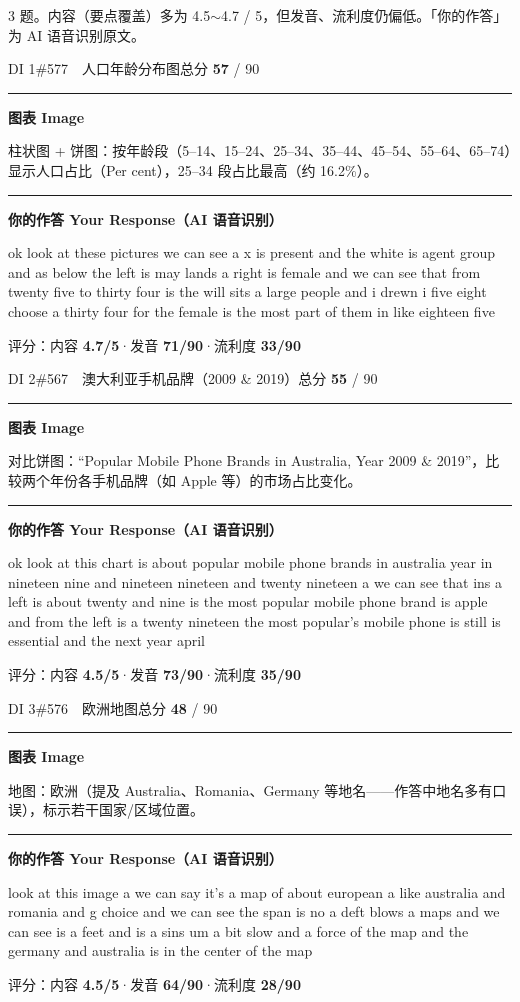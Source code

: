\documentclass[11pt]{article}
\newcommand{\sfull}[1]{\textcolor{cFix}{\bfseries #1}}     %
\newcommand{\spart}[1]{\textcolor{cPartial}{\bfseries #1}} %
\newcommand{\szero}[1]{\textcolor{cWrong}{\bfseries #1}}   %
\newcommand{\ptesub}[1]{%
  \par\needspace{2\baselineskip}\smallskip
  {\color{cAccent}\rule[-0.2ex]{3pt}{1.05em}}\hspace{6pt}%
  {\bfseries\color{cHead}#1}\par\nopagebreak\smallskip}
\begin{document}
{\small\color{gray} 3 题。内容（要点覆盖）多为 4.5$\sim$4.7 / 5，但发音、流利度仍偏低。「你的作答」为 AI 语音识别原文。}\smallskip

\begin{qblock}{DI 1\quad \#577\ \ 人口年龄分布图}{总分 \textcolor{cAccent}{\bfseries 57} / 90}
\ptesub{图表 Image}
\begin{promptbox}
柱状图 + 饼图：按年龄段（5--14、15--24、25--34、35--44、45--54、55--64、65--74）显示人口占比（Per cent），25--34 段占比最高（约 16.2\%）。
\end{promptbox}
\ptesub{你的作答 Your Response（AI 语音识别）}
\begin{youbox}
ok look at these pictures we can see a x is present and the white is agent group and as below the left is may lands a right is female and we can see that from twenty five to thirty four is the will sits a large people and i drewn i five eight choose a thirty four for the female is the most part of them in like eighteen five
\end{youbox}
{\small 评分：内容 \sfull{4.7/5}\quad·\quad 发音 \spart{71/90}\quad·\quad 流利度 \szero{33/90}}
\end{qblock}

\begin{qblock}{DI 2\quad \#567\ \ 澳大利亚手机品牌（2009 \& 2019）}{总分 \textcolor{cAccent}{\bfseries 55} / 90}
\ptesub{图表 Image}
\begin{promptbox}
对比饼图：``Popular Mobile Phone Brands in Australia, Year 2009 \& 2019''，比较两个年份各手机品牌（如 Apple 等）的市场占比变化。
\end{promptbox}
\ptesub{你的作答 Your Response（AI 语音识别）}
\begin{youbox}
ok look at this chart is about popular mobile phone brands in australia year in nineteen nine and nineteen nineteen and twenty nineteen a we can see that ins a left is about twenty and nine is the most popular mobile phone brand is apple and from the left is a twenty nineteen the most popular's mobile phone is still is essential and the next year april
\end{youbox}
{\small 评分：内容 \sfull{4.5/5}\quad·\quad 发音 \spart{73/90}\quad·\quad 流利度 \szero{35/90}}
\end{qblock}

\begin{qblock}{DI 3\quad \#576\ \ 欧洲地图}{总分 \textcolor{cAccent}{\bfseries 48} / 90}
\ptesub{图表 Image}
\begin{promptbox}
地图：欧洲（提及 Australia、Romania、Germany 等地名——作答中地名多有口误），标示若干国家/区域位置。
\end{promptbox}
\ptesub{你的作答 Your Response（AI 语音识别）}
\begin{youbox}
look at this image a we can say it's a map of about european a like australia and romania and g choice and we can see the span is no a deft blows a maps and we can see is a feet and is a sins um a bit slow and a force of the map and the germany and australia is in the center of the map
\end{youbox}
{\small 评分：内容 \sfull{4.5/5}\quad·\quad 发音 \spart{64/90}\quad·\quad 流利度 \szero{28/90}}
\end{qblock}
\end{document}
